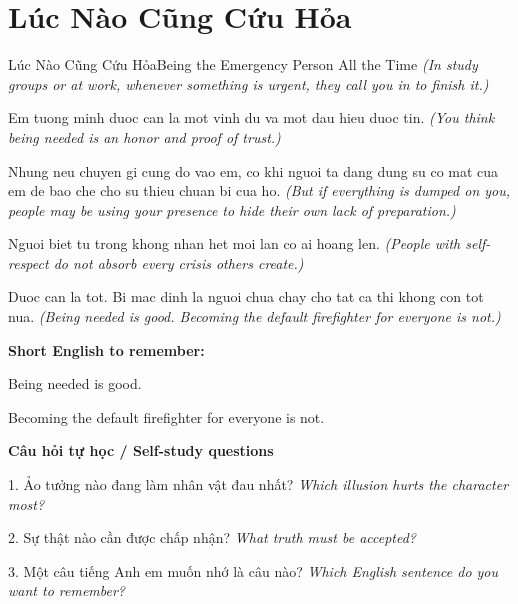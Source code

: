 \section{Lúc Nào Cũng Cứu Hỏa}
\begin{truyen}{Lúc Nào Cũng Cứu Hỏa}{Being the Emergency Person All the Time}
\textit{(In study groups or at work, whenever something is urgent, they call you in to finish it.)}

Em tuong minh duoc can la mot vinh du va mot dau hieu duoc tin.
\textit{(You think being needed is an honor and proof of trust.)}

Nhung neu chuyen gi cung do vao em, co khi nguoi ta dang dung su co mat cua em de bao che cho su thieu chuan bi cua ho.
\textit{(But if everything is dumped on you, people may be using your presence to hide their own lack of preparation.)}

Nguoi biet tu trong khong nhan het moi lan co ai hoang len.
\textit{(People with self-respect do not absorb every crisis others create.)}

\end{truyen}

\begin{baihoc}
Duoc can la tot. Bi mac dinh la nguoi chua chay cho tat ca thi khong con tot nua.
\textit{(Being needed is good. Becoming the default firefighter for everyone is not.)}
\end{baihoc}

\begin{ghinhoanh}
\textbf{Short English to remember:}

Being needed is good.

Becoming the default firefighter for everyone is not.

\end{ghinhoanh}

\begin{tuhocnhanh}
\textbf{Câu hỏi tự học / Self-study questions}

1. Ảo tưởng nào đang làm nhân vật đau nhất? \textit{Which illusion hurts the character most?}

2. Sự thật nào cần được chấp nhận? \textit{What truth must be accepted?}

3. Một câu tiếng Anh em muốn nhớ là câu nào? \textit{Which English sentence do you want to remember?}
\end{tuhocnhanh}
\ngancach

